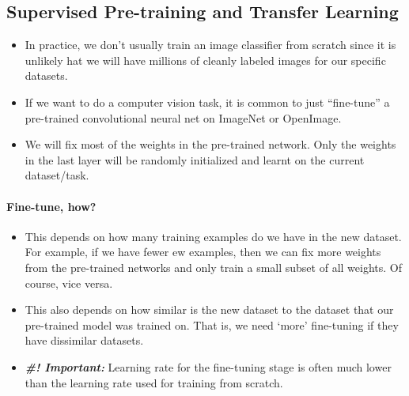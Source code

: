 \documentclass[11pt]{article}
\begin{document}
\subsection{Supervised Pre-training and Transfer Learning}
\begin{itemize}
    \item In practice, we don't usually train an image classifier from scratch since it is unlikely hat we will have millions of cleanly labeled images for our specific datasets. 
    \item If we want to do a computer vision task, it is common to just ``fine-tune'' a pre-trained convolutional neural net on ImageNet or OpenImage. 
    \item We will fix most of the weights in the pre-trained network. Only the weights in the last layer will be randomly initialized and learnt on the current dataset/task. 
\end{itemize}
\paragraph{Fine-tune, how?}
\begin{itemize}
    \item This depends on how many training examples do we have in the new dataset. For example, if we have fewer ew examples, then we can fix more weights from the pre-trained networks and only train a small subset of all weights. Of course, vice versa. 
    \item This also depends on how similar is the new dataset to the dataset that our pre-trained model was trained on. That is, we need `more' fine-tuning if they have dissimilar datasets.
    \item \textit{\textbf{\#! Important:}} Learning rate for the fine-tuning stage is often much lower than the learning rate used for training from scratch. 
\end{itemize}



















\newpage


\end{document}

